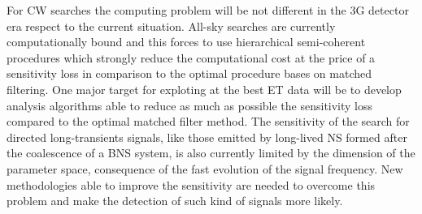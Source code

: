 For CW searches the computing problem will be not different in the 3G detector era respect to the current situation. All-sky searches are currently computationally bound and this forces to use hierarchical semi-coherent procedures which strongly reduce the computational cost at the price of a sensitivity loss in comparison to the optimal procedure bases on matched filtering. One major target for exploting at the best ET data will be to develop analysis algorithms able to reduce as much as possible the sensitivity loss compared to the optimal matched filter method. The sensitivity of the search for directed long-transients signals, like those emitted by long-lived NS formed after the coalescence of a BNS system, is also currently limited by the dimension of the parameter space, consequence of the fast evolution of the signal frequency. New methodologies able to improve the sensitivity are needed to overcome this problem and make the detection of such kind of signals more likely.    

  


